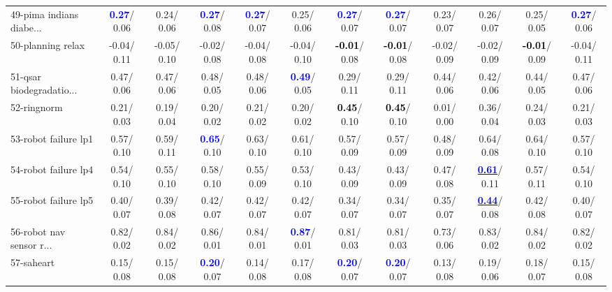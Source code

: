 \begin{table}[h]
\begin{center}
{\begin{tabular}{lc|c|c|c|c|c|c|c|c|c|c}
49-pima indians diabe... & \textcolor{blue}{\textbf{  0.27}}/  0.06 &   0.24/  0.06 & \textcolor{blue}{\textbf{  0.27}}/  0.08 & \textcolor{blue}{\textbf{  0.27}}/  0.07 &   0.25/  0.06 & \textcolor{blue}{\textbf{  0.27}}/  0.07 & \textcolor{blue}{\textbf{  0.27}}/  0.07 &   0.23/  0.07 &   0.26/  0.07 &   0.25/  0.05 & \textcolor{blue}{\textbf{  0.27}}/  0.06 \\
50-planning relax &  -0.04/  0.11 &  -0.05/  0.10 &  -0.02/  0.08 &  -0.04/  0.08 &  -0.04/  0.10 & \textcolor{black}{\textbf{ -0.01}}/  0.08 & \textcolor{black}{\textbf{ -0.01}}/  0.08 &  -0.02/  0.09 &  -0.02/  0.09 & \textcolor{black}{\textbf{ -0.01}}/  0.09 &  -0.04/  0.11 \\
51-qsar biodegradatio... &   0.47/  0.06 &   0.47/  0.06 &   0.48/  0.05 &   0.48/  0.06 & \textcolor{blue}{\textbf{  0.49}}/  0.05 &   0.29/  0.11 &   0.29/  0.11 &   0.44/  0.06 &   0.42/  0.06 &   0.44/  0.05 &   0.47/  0.06 \\
52-ringnorm &   0.21/  0.03 &   0.19/  0.04 &   0.20/  0.02 &   0.21/  0.02 &   0.20/  0.02 & \textcolor{black}{\textbf{  0.45}}/  0.10 & \textcolor{black}{\textbf{  0.45}}/  0.10 &   0.01/  0.00 &   0.36/  0.04 &   0.24/  0.03 &   0.21/  0.03 \\
53-robot failure lp1 &   0.57/  0.10 &   0.59/  0.11 & \textcolor{blue}{\textbf{  0.65}}/  0.10 &   0.63/  0.10 &   0.61/  0.10 &   0.57/  0.09 &   0.57/  0.09 &   0.48/  0.09 &   0.64/  0.08 &   0.64/  0.10 &   0.57/  0.10 \\ \hline
54-robot failure lp4 &   0.54/  0.10 &   0.55/  0.10 &   0.58/  0.10 &   0.55/  0.09 &   0.53/  0.10 &   0.43/  0.09 &   0.43/  0.09 &   0.47/  0.08 & \underline{\textcolor{blue}{\textbf{  0.61}}}/  0.11 &   0.57/  0.11 &   0.54/  0.10 \\
55-robot failure lp5 &   0.40/  0.07 &   0.39/  0.08 &   0.42/  0.07 &   0.42/  0.07 &   0.42/  0.07 &   0.34/  0.07 &   0.34/  0.07 &   0.35/  0.07 & \underline{\textcolor{blue}{\textbf{  0.44}}}/  0.08 &   0.42/  0.08 &   0.40/  0.07 \\
56-robot nav sensor r... &   0.82/  0.02 &   0.84/  0.02 &   0.86/  0.01 &   0.84/  0.01 & \textcolor{blue}{\textbf{  0.87}}/  0.01 &   0.81/  0.03 &   0.81/  0.03 &   0.73/  0.06 &   0.83/  0.02 &   0.84/  0.02 &   0.82/  0.02 \\
57-saheart &   0.15/  0.08 &   0.15/  0.08 & \textcolor{blue}{\textbf{  0.20}}/  0.07 &   0.14/  0.08 &   0.17/  0.08 & \textcolor{blue}{\textbf{  0.20}}/  0.07 & \textcolor{blue}{\textbf{  0.20}}/  0.07 &   0.13/  0.08 &   0.19/  0.06 &   0.18/  0.07 &   0.15/  0.08 \\

\end{tabular}}
\end{center}
\end{table}
